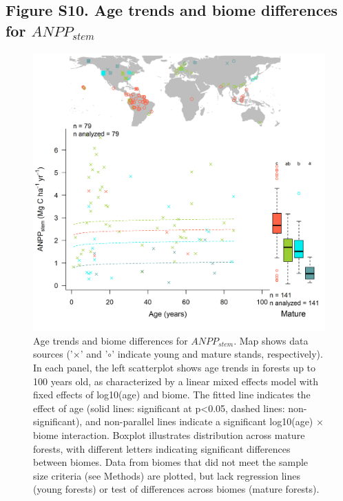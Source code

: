 \documentclass[
]{article}
\begin{document}
\newpage

\hypertarget{figure-s10.-age-trends-and-biome-differences-for-anpp_stem}{%
\subsection{\texorpdfstring{Figure S10. Age trends and biome differences
for
\(ANPP_{stem}\)}{Figure S10. Age trends and biome differences for ANPP\_\{stem\}}}\label{figure-s10.-age-trends-and-biome-differences-for-anpp_stem}}

\begin{figure}[H]

{\centering \includegraphics[width=1\linewidth]{tables_figures/age_trends/ANPP_stem_with_map} 

}

\caption{Age trends and biome differences for $ANPP_{stem}$. Map shows data sources ('$\times$' and '$\circ$' indicate young and mature stands, respectively). In each panel, the left scatterplot shows age trends in forests up to 100 years old, as characterized by a linear mixed effects model with fixed effects of log10(age) and biome. The fitted line indicates the effect of age (solid lines: significant at p<0.05, dashed lines: non-significant), and non-parallel lines indicate a significant log10(age) $\times$ biome interaction. Boxplot illustrates distribution across mature forests, with different letters indicating significant differences between biomes. Data from biomes that did not meet the sample size criteria (see Methods) are plotted, but lack regression lines (young forests) or test of differences across biomes (mature forests).}\label{fig:unnamed-chunk-13}
\end{figure}
\end{document}
